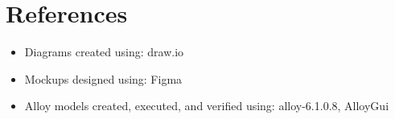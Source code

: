 \chapter{References}

\begin{itemize}
    \item Diagrams created using: draw.io
    \item Mockups designed using: Figma
    \item Alloy models created, executed, and verified using: alloy-6.1.0.8, AlloyGui
\end{itemize}
